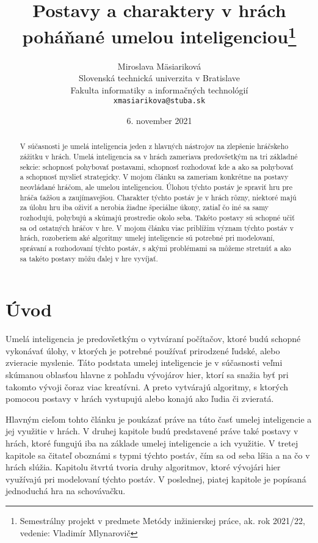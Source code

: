\documentclass[10pt,twoside,slovak,a4paper]{article}
\title{Postavy a charaktery v hrách poháňané umelou inteligenciou\thanks{Semestrálny projekt v predmete Metódy inžinierskej práce, ak. rok 2021/22, vedenie: Vladimír Mlynarovič}} %
\author{Miroslava Mäsiariková\\[2pt]
	{\small Slovenská technická univerzita v Bratislave}\\
	{\small Fakulta informatiky a informačných technológií}\\
	{\small \texttt{xmasiarikova@stuba.sk}}
	}
\date{\small 6. november 2021} %
\begin{document}
\maketitle

\begin{abstract}

V súčasnosti je umelá inteligencia jeden z hlavných nástrojov na zlepšenie hráčskeho zážitku v hrách. Umelá inteligencia sa v hrách zameriava predovšetkým na tri základné sekcie: schopnosť pohybovať postavami, schopnosť rozhodovať kde a ako sa pohybovať a schopnosť myslieť strategicky. V mojom článku sa zameriam konkrétne na postavy neovládané hráčom, ale umelou inteligenciou. Úlohou týchto postáv je spraviť hru pre hráča ťažšou a zaujímavejšou. Charakter týchto postáv je v hrách rôzny, niektoré majú za úlohu hru iba oživiť a nerobia žiadne špeciálne úkony, zatiaľ čo iné sa samy rozhodujú, pohybujú a skúmajú prostredie okolo seba. Takéto postavy sú schopné učiť sa od ostatných hráčov v hre. V mojom článku viac priblížim význam týchto postáv v hrách, rozoberiem aké algoritmy umelej inteligencie sú potrebné pri modelovaní, správaní a rozhodovaní týchto postáv, s akými problémami sa môžeme stretnúť a ako sa takéto postavy môžu ďalej v hre vyvíjať. 
\end{abstract}


\section{Úvod}

\quad Umelá inteligencia je predovšetkým o vytváraní počítačov, ktoré budú schopné vykonávať úlohy, v ktorých je potrebné používať prirodzené ľudské, alebo zvieracie myslenie. Táto podstata umelej inteligencie je v súčasnosti veľmi skúmanou oblasťou hlavne z pohľadu vývojárov hier, ktorí sa snažia byť pri takomto vývoji čoraz viac kreatívni. A preto vytvárajú algoritmy, s ktorých pomocou postavy v hrách vystupujú alebo konajú ako ľudia či zvieratá.

Hlavným cieľom tohto článku je poukázať práve na túto časť umelej inteligencie a jej využitie v hrách. V druhej kapitole budú predstavené práve také postavy v hrách, ktoré fungujú iba na základe umelej inteligencie a ich využitie. V tretej kapitole sa čitateľ oboznámi s typmi týchto postáv, čím sa od seba líšia a na čo v hrách slúžia. Kapitolu štvrtú tvoria druhy algoritmov, ktoré vývojári hier využívajú pri modelovaní týchto postáv. V poslednej, piatej kapitole je popísaná jednoduchá hra na schovávačku.
\end{document}
